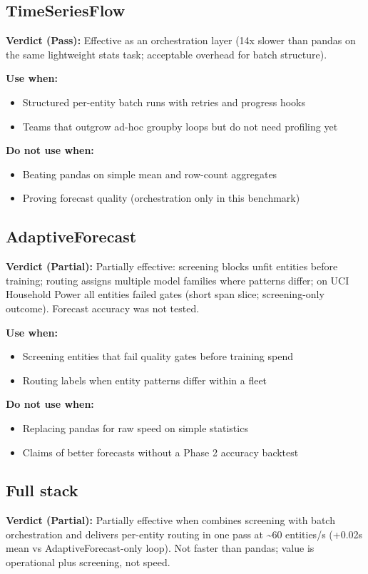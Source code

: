 \documentclass[11pt,a4paper]{article}
\begin{document}
\subsection{TimeSeriesFlow}
\noindent\textbf{Verdict (Pass):}
Effective as an orchestration layer (14x slower than pandas on the same lightweight stats task; acceptable overhead for batch structure).

\textbf{Use when:}
\begin{itemize}
  \item Structured per-entity batch runs with retries and progress hooks
  \item Teams that outgrow ad-hoc groupby loops but do not need profiling yet
\end{itemize}

\textbf{Do not use when:}
\begin{itemize}
  \item Beating pandas on simple mean and row-count aggregates
  \item Proving forecast quality (orchestration only in this benchmark)
\end{itemize}

\subsection{AdaptiveForecast}
\noindent\textbf{Verdict (Partial):}
Partially effective: screening blocks unfit entities before training; routing assigns multiple model families where patterns differ; on UCI Household Power all entities failed gates (short span slice; screening-only outcome). Forecast accuracy was not tested.

\textbf{Use when:}
\begin{itemize}
  \item Screening entities that fail quality gates before training spend
  \item Routing labels when entity patterns differ within a fleet
\end{itemize}

\textbf{Do not use when:}
\begin{itemize}
  \item Replacing pandas for raw speed on simple statistics
  \item Claims of better forecasts without a Phase 2 accuracy backtest
\end{itemize}

\subsection{Full stack}
\noindent\textbf{Verdict (Partial):}
Partially effective when combines screening with batch orchestration and delivers per-entity routing in one pass at \textasciitilde{}60 entities/s (+0.02s mean vs AdaptiveForecast-only loop). Not faster than pandas; value is operational plus screening, not speed.
\end{document}
